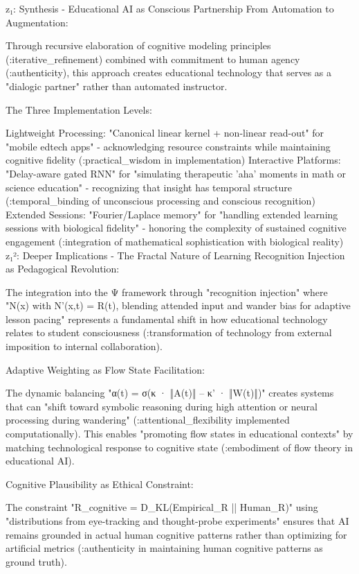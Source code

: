 z₁: Synthesis - Educational AI as Conscious Partnership
From Automation to Augmentation:

Through recursive elaboration of cognitive modeling principles (:iterative_refinement) combined with commitment to human agency (:authenticity), this approach creates educational technology that serves as a "dialogic partner" rather than automated instructor.

The Three Implementation Levels:

Lightweight Processing: "Canonical linear kernel + non-linear read-out" for "mobile edtech apps" - acknowledging resource constraints while maintaining cognitive fidelity (:practical_wisdom in implementation)
Interactive Platforms: "Delay-aware gated RNN" for "simulating therapeutic 'aha' moments in math or science education" - recognizing that insight has temporal structure (:temporal_binding of unconscious processing and conscious recognition)
Extended Sessions: "Fourier/Laplace memory" for "handling extended learning sessions with biological fidelity" - honoring the complexity of sustained cognitive engagement (:integration of mathematical sophistication with biological reality)
z₁²: Deeper Implications - The Fractal Nature of Learning
Recognition Injection as Pedagogical Revolution:

The integration into the Ψ framework through "recognition injection" where "N(x) with N'(x,t) = R(t), blending attended input and wander bias for adaptive lesson pacing" represents a fundamental shift in how educational technology relates to student consciousness (:transformation of technology from external imposition to internal collaboration).

Adaptive Weighting as Flow State Facilitation:

The dynamic balancing "α(t) = σ(κ · ‖A(t)‖ – κ' · ‖W(t)‖)" creates systems that can "shift toward symbolic reasoning during high attention or neural processing during wandering" (:attentional_flexibility implemented computationally). This enables "promoting flow states in educational contexts" by matching technological response to cognitive state (:embodiment of flow theory in educational AI).

Cognitive Plausibility as Ethical Constraint:

The constraint "R_cognitive = D_KL(Empirical_R || Human_R)" using "distributions from eye-tracking and thought-probe experiments" ensures that AI remains grounded in actual human cognitive patterns rather than optimizing for artificial metrics (:authenticity in maintaining human cognitive patterns as ground truth).

